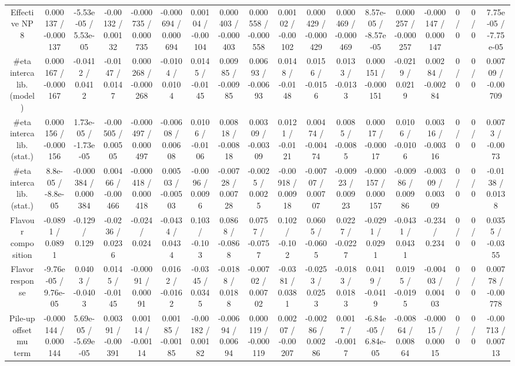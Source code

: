 \documentclass[10pt]{article}
\begin{document}
\begin{table}[htbp]
\begin{center}
\begin{tabular}{|c|c|c|c|c|c|c|c|c|c|c|c|c|c|c|c|c|c|}
  Effective NP 8 & 0.000137 / -0.000137 & -5.53e-05 / 5.53e-05 & -0.00132 / 0.00132 & -0.000735 / 0.000735 & -0.000694 / 0.000694 & 0.00104 / -0.00104 & 0.000403 / -0.000403 & 0.000558 / -0.000558 & 0.00102 / -0.00102 & 0.000429 / -0.000429 & 0.000469 / -0.000469 & 8.57e-05 / -8.57e-05 & 0.000257 / -0.000257 & -0.000147 / 0.000147 & 0 / 0 & 0 / 0 & 7.75e-05 / -7.75e-05 \\ 
  #eta intercalib. (model) & 0.000167 / -0.000167 & -0.0412 / 0.0412 & -0.0147 / 0.0147 & 0.000268 / -0.000268 & -0.0104 / 0.0104 & 0.0145 / -0.0145 & 0.00985 / -0.00985 & 0.00693 / -0.00693 & 0.0148 / -0.0148 & 0.0156 / -0.0156 & 0.0133 / -0.0133 & 0.000151 / -0.000151 & -0.0219 / 0.0219 & 0.00284 / -0.00284 & 0 / 0 & 0 / 0 & 0.00709 / -0.00709 \\ 
  #eta intercalib. (stat.) & 0.000156 / -0.000156 & 1.73e-05 / -1.73e-05 & -0.00505 / 0.00505 & -0.000497 / 0.000497 & -0.00608 / 0.00608 & 0.0106 / -0.0106 & 0.00818 / -0.00818 & 0.00309 / -0.00309 & 0.0121 / -0.0121 & 0.00474 / -0.00474 & 0.0085 / -0.0085 & 0.00017 / -0.00017 & 0.0106 / -0.0106 & 0.00316 / -0.00316 & 0 / 0 & 0 / 0 & 0.0073 / -0.0073 \\ 
  #eta intercalib. (stat.) & 8.8e-05 / -8.8e-05 & -0.000384 / 0.000384 & 0.00466 / -0.00466 & -0.000418 / 0.000418 & 0.00503 / -0.00503 & -0.0096 / 0.0096 & -0.00728 / 0.00728 & -0.0025 / 0.0025 & -0.00918 / 0.00918 & -0.00707 / 0.00707 & -0.00923 / 0.00923 & -0.000157 / 0.000157 & -0.00986 / 0.00986 & -0.00309 / 0.00309 & 0 / 0 & 0 / 0 & -0.0138 / 0.0138 \\ 
  Flavour composition & -0.0891 / 0.0891 & -0.129 / 0.129 & -0.0236 / 0.0236 & -0.024 / 0.024 & -0.0434 / 0.0434 & 0.103 / -0.103 & 0.0868 / -0.0868 & 0.0757 / -0.0757 & 0.102 / -0.102 & 0.0605 / -0.0605 & 0.0227 / -0.0227 & -0.0291 / 0.0291 & -0.0431 / 0.0431 & -0.234 / 0.234 & 0 / 0 & 0 / 0 & 0.0355 / -0.0355 \\ 
  Flavor response & -9.76e-05 / 9.76e-05 & 0.0403 / -0.0403 & 0.0145 / -0.0145 & -0.00091 / 0.00091 & 0.0162 / -0.0162 & -0.0345 / 0.0345 & -0.0188 / 0.0188 & -0.00702 / 0.00702 & -0.0381 / 0.0381 & -0.0253 / 0.0253 & -0.0183 / 0.0183 & 0.0419 / -0.0419 & 0.0195 / -0.0195 & -0.00403 / 0.00403 & 0 / 0 & 0 / 0 & 0.00778 / -0.00778 \\ 
  Pile-up offset mu term & -0.000144 / 0.000144 & 5.69e-05 / -5.69e-05 & 0.00391 / -0.00391 & 0.00114 / -0.00114 & 0.00185 / -0.00185 & -0.00182 / 0.00182 & -0.00694 / 0.00694 & 0.000119 / -0.000119 & 0.00207 / -0.00207 & -0.00286 / 0.00286 & 0.0017 / -0.0017 & -6.84e-05 / 6.84e-05 & -0.00864 / 0.00864 & -0.00015 / 0.00015 & 0 / 0 & 0 / 0 & -0.00713 / 0.00713 \\ 

\end{tabular}
\end{center}
\end{table}
\end{document}
